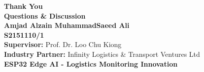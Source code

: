 \documentclass[aspectratio=169]{beamer}
\begin{document}
\begin{frame}{}
\begin{center}
\vspace{1.5cm}
{\Huge \textcolor{umblue}{\textbf{Thank You}}}\\
\vspace{1cm}
{\Large \textbf{Questions \& Discussion}}\\
\vspace{1cm}
\textbf{Amjad Alzain MuhammadSaeed Ali}\\
\textbf{S2151110/1}\\
\vspace{0.5cm}
\textbf{Supervisor:} Prof. Dr. Loo Chu Kiong\\
\textbf{Industry Partner:} Infinity Logistics \& Transport Ventures Ltd\\
\vspace{0.5cm}
\textcolor{umblue}{\textbf{ESP32 Edge AI - Logistics Monitoring Innovation}}
\end{center}
\end{frame}
\end{document}
